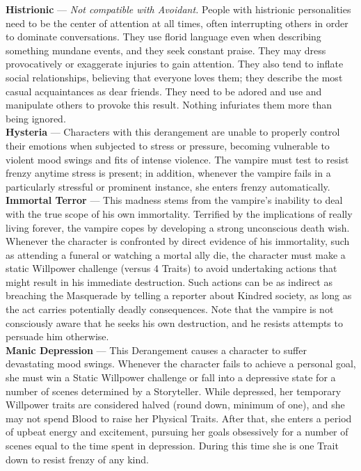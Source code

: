 \textbf{Histrionic} --- \emph{Not compatible with Avoidant.}  People with histrionic personalities need to be the center of attention at all times, often interrupting others in order to dominate conversations.  They use florid language even when describing something mundane events, and they seek constant praise.  They may dress provocatively or exaggerate injuries to gain attention.  They also tend to inflate social relationships, believing that everyone loves them; they describe the most casual acquaintances as dear friends.  They need to be adored and use and manipulate others to provoke this result.  Nothing infuriates them more than being ignored. \\

\textbf{Hysteria} --- Characters with this derangement are unable to properly control their emotions when subjected to stress or pressure, becoming vulnerable to violent mood swings and fits of intense violence.  The vampire must test to resist frenzy anytime stress is present; in addition, whenever the vampire fails in a particularly stressful or prominent instance, she enters frenzy automatically. \\

\textbf{Immortal Terror} --- This madness stems from the vampire's inability to deal with the true scope of his own immortality.  Terrified by the implications of really living forever, the vampire copes by developing a strong unconscious death wish.  Whenever the character is confronted by direct evidence of his immortality, such as attending a funeral or watching a mortal ally die, the character must make a static Willpower challenge (versus 4 Traits) to avoid undertaking actions that might result in his immediate destruction.  Such actions can be as indirect as breaching the Masquerade by telling a reporter about Kindred society, as long as the act carries potentially deadly consequences.  Note that the vampire is not consciously aware that he seeks his own destruction, and he resists attempts to persuade him otherwise. \\

\textbf{Manic Depression} --- This Derangement causes a character to suffer devastating mood swings.  Whenever the character fails to achieve a personal goal, she must win a Static Willpower challenge or fall into a depressive state for a number of scenes determined by a Storyteller.  While depressed, her temporary Willpower traits are considered halved (round down, minimum of one), and she may not spend Blood to raise her Physical Traits.  After that, she enters a period of upbeat energy and excitement, pursuing her goals obsessively for a number of scenes equal to the time spent in depression.  During this time she is one Trait down to resist frenzy of any kind. \\

